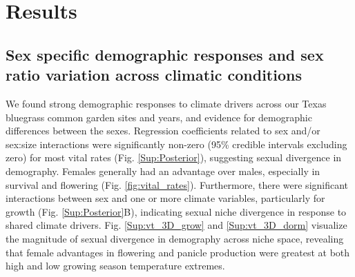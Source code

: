 \documentclass[12pt]{article}\usepackage[]{graphicx}\usepackage[dvipsnames]{xcolor}
\newcommand{\tom}[2]{{\color{red}{#1}}\footnote{\textit{\color{red}{#2}}}}
\begin{document}
\section*{Results}

\subsection*{Sex specific demographic responses and sex ratio variation across climatic conditions}
We found strong demographic responses to climate drivers across our Texas bluegrass common garden sites and years, and evidence for demographic differences between the sexes. 
Regression coefficients related to sex and/or sex:size interactions were significantly non-zero (95\% credible intervals excluding zero) for most vital rates (Fig. \ref{Sup:Posterior}), suggesting sexual divergence in demography. 
Females generally had an advantage over males, especially in survival and flowering (Fig. \ref{fig:vital_rates}). 
Furthermore, there were significant interactions between sex and one or more climate variables, particularly for growth (Fig. \ref{Sup:Posterior}B), indicating sexual niche divergence in response to shared climate drivers.  
Fig. \ref{Sup:vt_3D_grow} and \ref{Sup:vt_3D_dorm} visualize the magnitude of sexual divergence in demography across niche space, revealing that female advantages in flowering and panicle production were greatest at both high and low growing season temperature extremes. 

\end{document}
